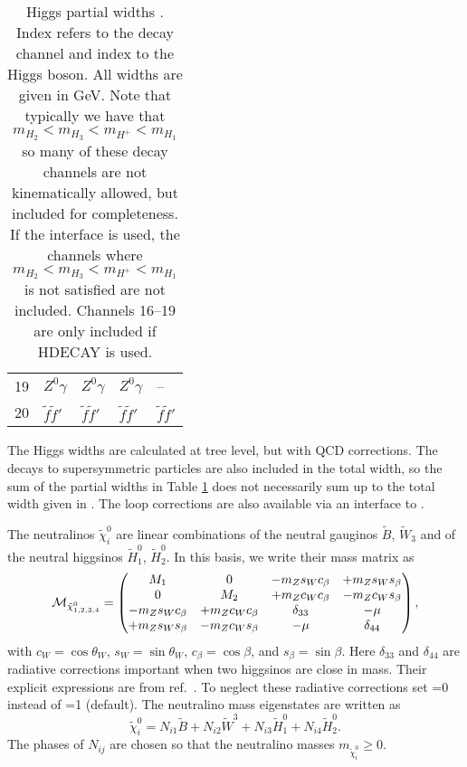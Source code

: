 \begin{table}
\begin{tabular}{lllll}
19 & $Z^0 \gamma$        & $Z^0 \gamma$        & $Z^0 \gamma$        & --\\
20 & $\tilde{f} \tilde{f}'$ & $\tilde{f} \tilde{f}'$ & $\tilde{f} \tilde{f}'$ & $\tilde{f} \tilde{f}'$\\ \hline
\end{tabular}
\caption{Higgs partial widths . Index  refers to the decay channel and index  to the Higgs boson. All widths are given in GeV\@. Note that typically we have that $m_{H_2}< m_{H_3}<m_{H^+}<m_{H_1}$ so many of these decay channels are not kinematically allowed, but included for completeness. If the  interface is used, the channels where $m_{H_2}< m_{H_3}<m_{H^+}<m_{H_1}$ is not satisfied are not included. Channels 16--19 are only included if HDECAY is used.}
\label{tab:hwidth}
\end{table}

The Higgs widths are calculated at tree level, but with QCD corrections. The decays to supersymmetric particles are also included in the total width, so the sum of the partial widths in Table \ref{tab:hwidth} does not necessarily sum up to the total width given in . The loop corrections are also available via an interface to .

  
The neutralinos $ \tilde{\chi}^0_i$ are linear combinations of the neutral
gauginos ${\tilde B}$, ${\tilde W_3}$ and of the neutral higgsinos ${\tilde
  H_1^0}$, ${\tilde H_2^0}$.  In this basis, we write their mass matrix as
\begin{eqnarray}
  {{\cal M}}_{\tilde \chi^0_{1,2,3,4}} = 
  \left( \begin{matrix} %
  {M_1} & 0 & -m_Z s_W c_\beta & +m_Z s_W s_\beta \cr
  0 & {M_2} & +m_Z c_W c_\beta & -m_Z c_W s_\beta \cr
  -m_Z s_W c_\beta & +m_Z c_W c_\beta & \delta_{33} & -\mu \cr
  +m_Z s_W s_\beta & -m_Z c_W s_\beta & -\mu & \delta_{44} \cr
  \end{matrix} %
  \right) ,
\end{eqnarray}
with $c_W=\cos\theta_W$, $s_W=\sin\theta_W$, $c_\beta=\cos\beta$, and
$s_\beta=\sin\beta$.  Here $\delta_{33}$ and $\delta_{44}$ are radiative
corrections important when two higgsinos are close in mass. Their explicit
expressions are from ref.~\cite{Drees:1996pk}. To neglect these radiative
corrections set =0 instead of =1 (default). The
neutralino mass eigenstates are written as
\begin{equation}
  \tilde{\chi}^0_i = 
  N_{i1} \tilde{B} + N_{i2} \tilde{W}^3 + 
  N_{i3} \tilde{H}^0_1 + N_{i4} \tilde{H}^0_2 .
\end{equation}
The phases of $N_{ij}$ are chosen so that the neutralino masses
$m_{\tilde{\chi}^0_i} \ge 0$.


